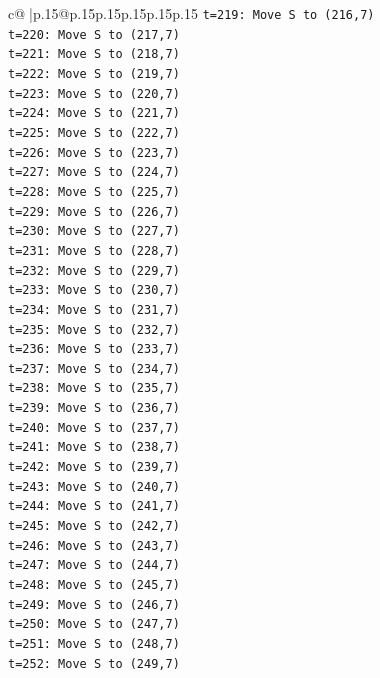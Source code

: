 \documentclass{article}
\begin{document}
{\begin{supertabular}{c@{$\;$}|p{.15\linewidth}@{}p{.15\linewidth}p{.15\linewidth}p{.15\linewidth}p{.15\linewidth}p{.15\linewidth}}
{{{\texttt{t=219: Move S to (216,7)} \\
\texttt{t=220: Move S to (217,7)} \\
\texttt{t=221: Move S to (218,7)} \\
\texttt{t=222: Move S to (219,7)} \\
\texttt{t=223: Move S to (220,7)} \\
\texttt{t=224: Move S to (221,7)} \\
\texttt{t=225: Move S to (222,7)} \\
\texttt{t=226: Move S to (223,7)} \\
\texttt{t=227: Move S to (224,7)} \\
\texttt{t=228: Move S to (225,7)} \\
\texttt{t=229: Move S to (226,7)} \\
\texttt{t=230: Move S to (227,7)} \\
\texttt{t=231: Move S to (228,7)} \\
\texttt{t=232: Move S to (229,7)} \\
\texttt{t=233: Move S to (230,7)} \\
\texttt{t=234: Move S to (231,7)} \\
\texttt{t=235: Move S to (232,7)} \\
\texttt{t=236: Move S to (233,7)} \\
\texttt{t=237: Move S to (234,7)} \\
\texttt{t=238: Move S to (235,7)} \\
\texttt{t=239: Move S to (236,7)} \\
\texttt{t=240: Move S to (237,7)} \\
\texttt{t=241: Move S to (238,7)} \\
\texttt{t=242: Move S to (239,7)} \\
\texttt{t=243: Move S to (240,7)} \\
\texttt{t=244: Move S to (241,7)} \\
\texttt{t=245: Move S to (242,7)} \\
\texttt{t=246: Move S to (243,7)} \\
\texttt{t=247: Move S to (244,7)} \\
\texttt{t=248: Move S to (245,7)} \\
\texttt{t=249: Move S to (246,7)} \\
\texttt{t=250: Move S to (247,7)} \\
\texttt{t=251: Move S to (248,7)} \\
\texttt{t=252: Move S to (249,7)} \\
}}}
\end{supertabular}}
\end{document}
